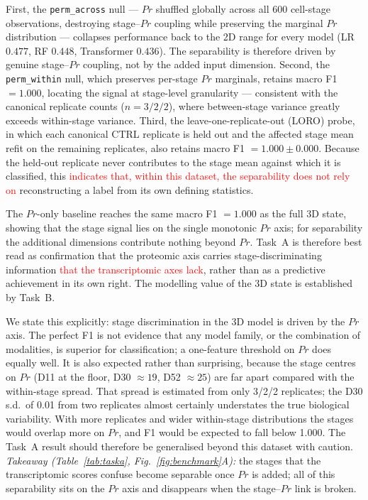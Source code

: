 \documentclass[5p,times,twocolumn]{elsarticle}
\newcommand{\rtag}[1]{}
\newcommand{\rev}[2]{\rtag{#1}\textcolor{red}{#2}}
\newenvironment{revblock}[1]{\par\color{red}\rtag{#1}\ignorespaces}{\par}
\begin{document}
First, the \texttt{perm\_across} null --- $Pr$ shuffled globally
across all 600 cell-stage observations, destroying stage--$Pr$
coupling while preserving the marginal $Pr$ distribution ---
collapses performance back to the 2D range for every model
(LR $0.477$, RF $0.448$, Transformer $0.436$).
The separability is therefore driven by genuine stage--$Pr$
coupling, not by the added input dimension.
Second, the \texttt{perm\_within} null, which preserves per-stage
$Pr$ marginals, retains macro F1 $= 1.000$, locating the signal
at stage-level granularity --- consistent with the canonical
replicate counts ($n = 3/2/2$), where between-stage variance
greatly exceeds within-stage variance.
Third, the leave-one-replicate-out (LORO) probe, in which each
canonical CTRL replicate is held out and the affected stage mean
refit on the remaining replicates, also retains macro F1
$= 1.000 \pm 0.000$.
Because the held-out replicate never contributes to the stage
mean against which it is classified, this \rev{R1.3}{indicates that,
  within this dataset, the separability does not rely on}
reconstructing a label from its own defining statistics.

The $Pr$-only baseline reaches the same macro F1 $= 1.000$ as
the full 3D state, showing that the stage signal lies on the
single monotonic $Pr$ axis; for separability the additional
dimensions contribute nothing beyond $Pr$.
Task~A is therefore best read as confirmation that the proteomic
axis carries stage-discriminating information \rev{AC}{that the
  transcriptomic axes lack}, rather than
as a predictive achievement in its own right.
The modelling value of the 3D state is established by Task~B.
\begin{revblock}{R2.12,R1.8,R1.5}
  We state this explicitly: stage discrimination in the 3D model
  is driven by the $Pr$ axis. The perfect F1 is not evidence that
  any model family, or the combination of modalities, is superior
  for classification; a one-feature threshold on $Pr$ does equally
  well. It is also expected rather than surprising, because the
  stage centres on $Pr$ (D11 at the floor, D30 $\approx 19$,
  D52 $\approx 25$) are far apart compared with the within-stage
  spread. That spread is estimated from only 3/2/2 replicates;
  the D30 s.d.\ of 0.01 from two replicates almost certainly
  understates the true biological variability. With more
  replicates and wider within-stage distributions the stages would
  overlap more on $Pr$, and F1 would be expected to fall below
  1.000. The Task~A result should therefore be generalised beyond
  this dataset with caution.
  \textit{Takeaway (Table~\ref{tab:taska},
    Fig.~\ref{fig:benchmark}A):} the stages that the transcriptomic
  scores confuse become separable once $Pr$ is added; all of this
  separability sits on the $Pr$ axis and disappears when the
  stage--$Pr$ link is broken.
\end{revblock}
\end{document}
